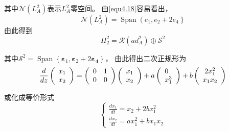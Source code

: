 \begin{solve}
其中$\mathscr { N } \left( L _ { A } ^ { 2 } \right)$表示$L _ { A } ^ { 2 }$零空间。
由\ref{equ4.18}容易看出，
\[
\mathscr { N } \left( L _ { A } ^ { 2 } \right) = \operatorname { Span } \left( e _ { 1 } , e _ { 2 } + 2 e _ { 4 } \right\}
\]
由此得到
\[
H _ { 2 } ^ { 2 } = \mathscr { R } ( ad_A^2 ) \oplus \mathscr {  S} ^ { 2 }
\]

其中$\mathscr { S } ^ { 2 } = \operatorname { Span } \left\{ \boldsymbol { \varepsilon } _ { 1 } , \boldsymbol { \varepsilon } _ { 2 } + 2 \boldsymbol { \varepsilon } _ { \mathbf { 4 } } \right\}$，
由此得出二次正规形为
\[
  \frac { d } { d z } \left(
    \begin{array} { l }
      { x _ { 1 } } \\
      { x _ { 2 } }
    \end{array}
  \right)
  = \left(
    \begin{array} { l l }
      { 0 } & { 1 } \\
      { 0 } & { 0 }
    \end{array}
  \right)
  \left(
    \begin{array} { l }
      { x _ { 1 } } \\
      { x _ { 2 } }
    \end{array}
  \right)
  + a \left(
    \begin{array} { l }
      { 0 } \\
      { x _ { 1 } ^ { 3 } }
    \end{array}
  \right)
  + b \left(
    \begin{array} { c }
      { 2 x _ { 1 } ^ { 2 } } \\
      { x _ { 1 } x _ { 2} }
    \end{array}
  \right)
\]

或化成等价形式
\[
  \left\{
    \begin{array} { l }
      { \frac { d x _ { 1 } } { d t } = x _ { 2 } + 2 b x _ { 1 } ^ { 2 } } \\
      { \frac { d x _ { 2 } } { d t } = a x _ { 1 } ^ { 2 } + b x _ { 1 } x _ { 2 } }
    \end{array}
  \right.
\]
\end{solve}

